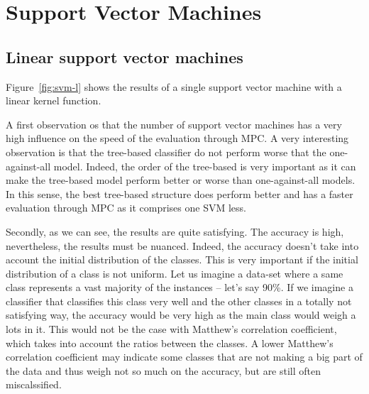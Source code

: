 \section{Support Vector Machines}

\subsection{Linear support vector machines}
Figure~\ref{fig:svm-l} shows the results of a single support vector machine with a linear kernel function. 

A first observation os that the number of support vector machines has a very high influence on the speed of the evaluation through MPC. A very interesting observation is that the tree-based classifier do not perform worse that the one-against-all model. Indeed, the order of the tree-based is very important as it can make the tree-based model perform better or worse than one-against-all models. In this sense, the best tree-based structure does perform better and has a faster evaluation through MPC as it comprises one SVM less.

Secondly, as we can see, the results are quite satisfying. The accuracy is high, nevertheless, the results must be nuanced. Indeed, the accuracy doesn't take into account the initial distribution of the classes. This is very important if the initial distribution of a class is not uniform. Let us imagine a data-set where a same class represents a vast majority of the instances -- let's say 90\%. If we imagine a classifier that classifies this class very well and the other classes in a totally not satisfying way, the accuracy would be very high as the main class would weigh a lots in it. This would not be the case with Matthew's correlation coefficient, which takes into account the ratios between the classes. A lower Matthew's correlation coefficient may indicate some classes that are not making a big part of the data and thus weigh not so much on the accuracy, but are still often miscalssified.

